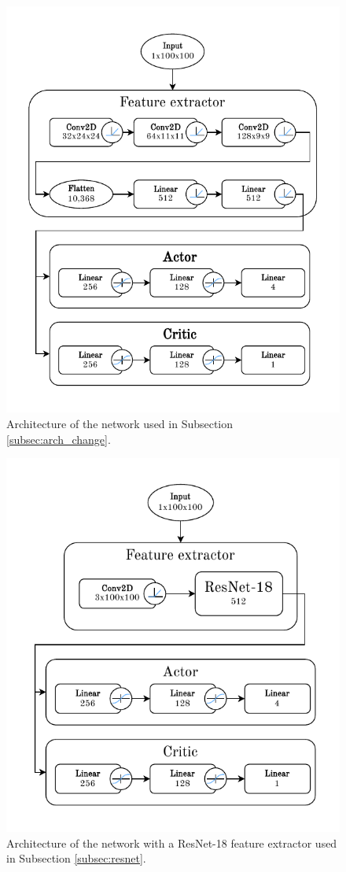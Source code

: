 \documentclass[
  digital,     %
  oneside,     %
  nosansbold,  %
  nocolorbold, %
  lof,         %
  lot,         %
]{fithesis4}
\begin{document}
\begin{figure}
    \includegraphics[width=1\linewidth]{diagrams/bigger_net_arch.pdf}
    \caption{Architecture of the network used in Subsection \ref{subsec:arch_change}.}
    \label{fig:bigger_net_policy}
\end{figure}

\begin{figure}
    \includegraphics[width=1\linewidth]{diagrams/resnet_arch.pdf}
    \caption{Architecture of the network with a ResNet-18 feature extractor used in Subsection \ref{subsec:resnet}.}
    \label{fig:resnet_arch}
\end{figure}
\end{document}
